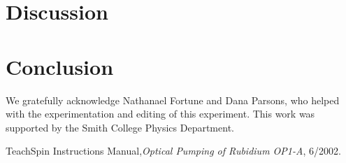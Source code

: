 \documentclass[prb,preprint]{revtex4-1}
\begin{document}
\section{Discussion}

\section{Conclusion}


\begin{acknowledgments}

We gratefully acknowledge Nathanael Fortune and Dana Parsons, who helped with the experimentation and editing of this experiment.  This work was supported by the Smith College Physics Department.

\end{acknowledgments}


\begin{thebibliography}{99}

 TeachSpin Instructions Manual,\textit{Optical Pumping of Rubidium OP1-A}, 6/2002.

\end{thebibliography}

\end{document}
